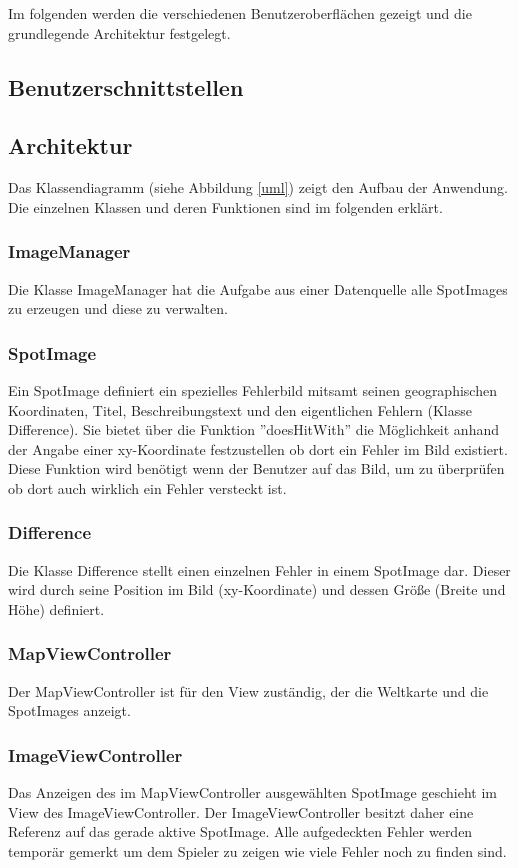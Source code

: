 Im folgenden werden die verschiedenen Benutzeroberflächen gezeigt und die grundlegende Architektur festgelegt.

\subsection{Benutzerschnittstellen}



\subsection{Architektur}
Das Klassendiagramm (siehe Abbildung \ref{uml}) zeigt den Aufbau der Anwendung. Die einzelnen Klassen und deren Funktionen sind im folgenden erklärt.

\subsubsection*{ImageManager}
Die Klasse ImageManager hat die Aufgabe aus einer Datenquelle alle SpotImages zu erzeugen und diese zu verwalten.

\subsubsection*{SpotImage}
Ein SpotImage definiert ein spezielles Fehlerbild mitsamt seinen geographischen Koordinaten, Titel, Beschreibungstext und den eigentlichen Fehlern (Klasse Difference). Sie bietet über die Funktion ''doesHitWith'' die Möglichkeit anhand der Angabe einer xy-Koordinate festzustellen ob dort ein Fehler im Bild existiert. Diese Funktion wird benötigt wenn der Benutzer auf das Bild, um zu überprüfen ob dort auch wirklich ein Fehler versteckt ist.

\subsubsection*{Difference}
Die Klasse Difference stellt einen einzelnen Fehler in einem SpotImage dar. Dieser wird durch seine Position im Bild (xy-Koordinate) und dessen Größe (Breite und Höhe) definiert.

\subsubsection*{MapViewController}
Der MapViewController ist für den View zuständig, der die Weltkarte und die SpotImages anzeigt.

\subsubsection*{ImageViewController}
Das Anzeigen des im MapViewController ausgewählten SpotImage geschieht im View des ImageViewController. Der ImageViewController besitzt daher eine Referenz auf das gerade aktive SpotImage. Alle aufgedeckten Fehler werden temporär gemerkt um dem Spieler zu zeigen wie viele Fehler noch zu finden sind.

